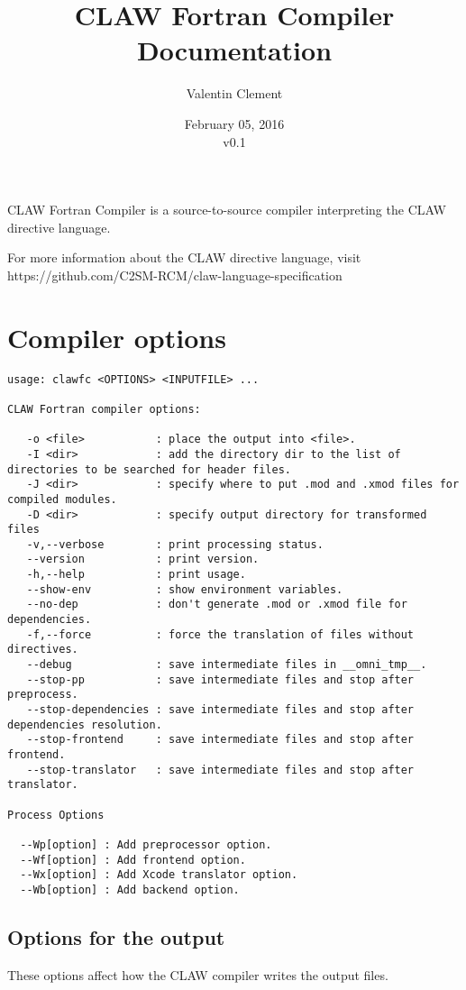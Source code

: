 \documentclass{article}
\title{CLAW Fortran Compiler Documentation}
\author{Valentin Clement}
\date{February 05, 2016\\\vspace{1em}v0.1}
\begin{document}
\maketitle

CLAW Fortran Compiler is a source-to-source compiler interpreting the CLAW
directive language.

For more information about the CLAW directive language, visit
https://github.com/C2SM-RCM/claw-language-specification


\section{Compiler options}
\begin{lstlisting}
usage: clawfc <OPTIONS> <INPUTFILE> ...

CLAW Fortran compiler options:

   -o <file>           : place the output into <file>.
   -I <dir>            : add the directory dir to the list of directories to be searched for header files.
   -J <dir>            : specify where to put .mod and .xmod files for compiled modules.
   -D <dir>            : specify output directory for transformed files
   -v,--verbose        : print processing status.
   --version           : print version.
   -h,--help           : print usage.
   --show-env          : show environment variables.
   --no-dep            : don't generate .mod or .xmod file for dependencies.
   -f,--force          : force the translation of files without directives.
   --debug             : save intermediate files in __omni_tmp__.
   --stop-pp           : save intermediate files and stop after preprocess.
   --stop-dependencies : save intermediate files and stop after dependencies resolution.
   --stop-frontend     : save intermediate files and stop after frontend.
   --stop-translator   : save intermediate files and stop after translator.

Process Options

  --Wp[option] : Add preprocessor option.
  --Wf[option] : Add frontend option.
  --Wx[option] : Add Xcode translator option.
  --Wb[option] : Add backend option.
\end{lstlisting}

\subsection{Options for the output}
These options affect how the CLAW compiler writes the output files.
\end{document}

